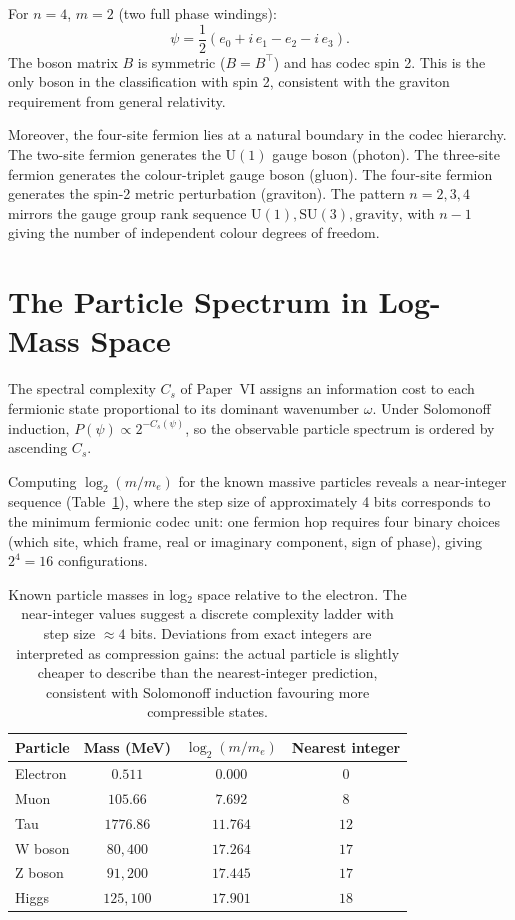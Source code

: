 \documentclass[11pt]{article}
\begin{document}
For $n=4$, $m=2$ (two full phase windings):
\[
  \psi = \frac{1}{2}(e_0 + i\,e_1 - e_2 - i\,e_3).
\]
The boson matrix $B$ is symmetric ($B = B^\top$) and has codec spin 2.
This is the only boson in the classification with spin 2, consistent
with the graviton requirement from general relativity.

Moreover, the four-site fermion lies at a natural boundary in the codec
hierarchy.
The two-site fermion generates the $\mathrm{U}(1)$ gauge boson (photon).
The three-site fermion generates the colour-triplet gauge boson (gluon).
The four-site fermion generates the spin-2 metric perturbation (graviton).
The pattern $n = 2, 3, 4$ mirrors the gauge group rank sequence
$\mathrm{U}(1), \mathrm{SU}(3), \text{gravity}$, with $n-1$ giving
the number of independent colour degrees of freedom.

\section{The Particle Spectrum in Log-Mass Space}
\label{sec:spectrum}

The spectral complexity $C_s$ of Paper~VI assigns an information cost to
each fermionic state proportional to its dominant wavenumber $\omega$.
Under Solomonoff induction, $P(\psi) \propto 2^{-C_s(\psi)}$, so the
observable particle spectrum is ordered by ascending $C_s$.

Computing $\log_2(m/m_e)$ for the known massive particles reveals a
near-integer sequence (Table~\ref{tab:masses}), where the step size of
approximately 4 bits corresponds to the minimum fermionic codec unit:
one fermion hop requires four binary choices (which site, which frame,
real or imaginary component, sign of phase), giving $2^4 = 16$
configurations.

\begin{table}[h]
\centering
\begin{tabular}{lccc}
\toprule
Particle & Mass (MeV) & $\log_2(m/m_e)$ & Nearest integer \\
\midrule
Electron & $0.511$    & $0.000$ & $0$  \\
Muon     & $105.66$   & $7.692$ & $8$  \\
Tau      & $1776.86$  & $11.764$& $12$ \\
W boson  & $80{,}400$ & $17.264$& $17$ \\
Z boson  & $91{,}200$ & $17.445$& $17$ \\
Higgs    & $125{,}100$& $17.901$& $18$ \\
\bottomrule
\end{tabular}
\caption{Known particle masses in log$_2$ space relative to the electron.
The near-integer values suggest a discrete complexity ladder with step
size $\approx 4$ bits.
Deviations from exact integers are interpreted as compression gains:
the actual particle is slightly cheaper to describe than the
nearest-integer prediction, consistent with Solomonoff induction
favouring more compressible states.}
\label{tab:masses}
\end{table}
\end{document}
